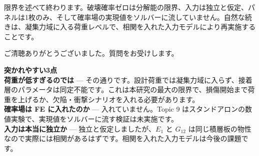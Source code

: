 \documentclass[11pt,a4paper]{ltjsarticle}
\begin{document}
限界を述べて終わります。破壊確率ゼロは分解能の限界、入力は独立と仮定、パネルは1枚のみ、そして確率場の実現値をソルバーに流していません。自然な続きは、凝集力域に入る荷重レベルで、相関を入れた入力モデルにより再実施することです。

ご清聴ありがとうございました。質問をお受けします。

\vspace{1em}
\begin{tcolorbox}[colback=soft,colframe=alertred,boxrule=0.6pt,arc=2pt]
{\bfseries 突かれやすい3点}\\[0.4em]
\textbf{荷重が低すぎるのでは} --- その通りです。設計荷重では凝集力域に入らず、接着層のパラメータは同定不能です。これは本研究の最大の限界で、損傷開始まで荷重を上げるか、欠陥・衝撃シナリオを入れる必要があります。\\[0.4em]
\textbf{確率場は FE に入れたのか} --- 入れていません。Topic 9 はスタンドアロンの数値実験で、実現値をソルバーに流す検証は未実施です。\\[0.4em]
\textbf{入力は本当に独立か} --- 独立と仮定しましたが、$E_1$ と $G_{12}$ は同じ積層板の物性なので実際には相関があるはずです。相関を入れた入力モデルは今後の課題です。
\end{tcolorbox}
\end{document}

